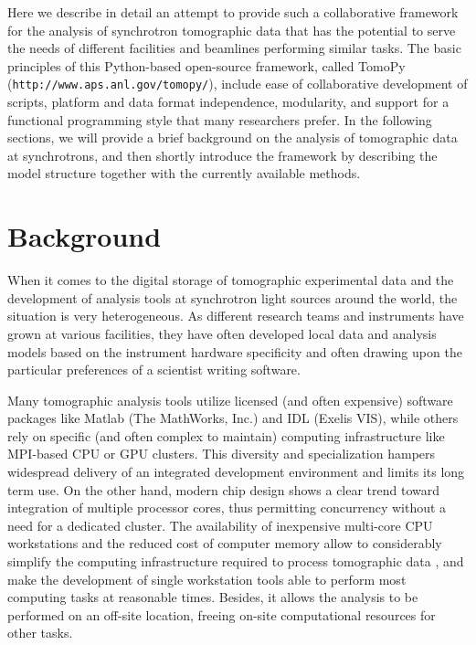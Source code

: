 \documentclass[pdf]{iucr}              %
\begin{document}
Here we describe in detail an attempt to provide such a collaborative framework for the analysis of synchrotron tomographic data that has the potential to serve the needs of different facilities and beamlines performing similar tasks. The basic principles of this Python-based open-source framework, called TomoPy (\texttt{http://www.aps.anl.gov/tomopy/}), include ease of collaborative development of scripts, platform and data format independence, modularity,  and support for a functional programming style that many researchers prefer. In the following sections, we will provide a brief background on the analysis of tomographic data at synchrotrons, and then shortly introduce the framework by describing the model structure together with the currently available methods. 


\section{Background}

When it comes to the digital storage of tomographic experimental data and the development of analysis tools at synchrotron light sources around the world, the situation is very heterogeneous. As different research teams and instruments have grown at various facilities, they have often developed local data and analysis models based on the instrument hardware specificity and often drawing upon the particular preferences of a scientist writing software. 

Many tomographic analysis tools utilize licensed (and often expensive) software packages like Matlab (The MathWorks, Inc.) and IDL (Exelis VIS), while others rely on specific (and often complex to maintain) computing infrastructure like MPI-based CPU or GPU clusters. This diversity and specialization hampers widespread delivery of an integrated development environment and limits its long term use. On the other hand, modern chip design shows a clear trend toward integration of multiple processor cores, thus permitting concurrency without a need for a dedicated cluster. The availability of inexpensive multi-core CPU workstations and the reduced cost of computer memory allow to considerably simplify the computing infrastructure required to process tomographic data \cite{rivers_spie_2012}, and make the development of single workstation tools able to perform most computing tasks at reasonable times. Besides, it allows the analysis to be performed on an off-site location, freeing on-site computational resources for other tasks. 
\end{document}
